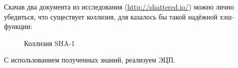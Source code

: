 Скачав два документа из исследования (\url{http://shattered.io/}) можно лично убедиться, что существует коллизия, для казалось бы такой надёжной хэш-функции:
\begin{figure}[h!]
  \caption{Коллизия SHA-1}
\end{figure}

С использованием полученных знаний, реализуем ЭЦП.